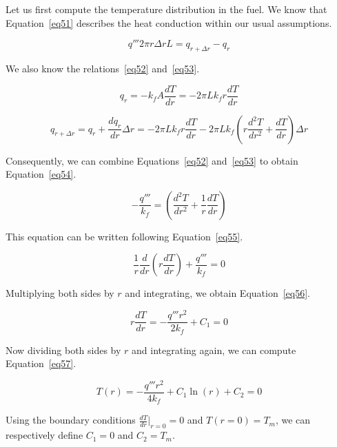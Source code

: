 Let us first compute the temperature distribution in the fuel. We know that Equation~\ref{eq51} describes the heat conduction within our usual assumptions.

\begin{equation}\label{eq51}
q'''2\pi r\Delta rL = q_{r+\Delta r} - q_r
\end{equation}

We also know the relations~\ref{eq52} and~\ref{eq53}.


\begin{equation}\label{eq52}
q_r = -k_fA\frac{dT}{dr} = -2\pi Lk_fr\frac{dT}{dr}
\end{equation}


\begin{equation}\label{eq53}
q_{r+\Delta r} = q_r + \frac{dq_r}{dr}\Delta r = -2\pi Lk_fr\frac{dT}{dr} - 2\pi Lk_f\left( r\frac{d^2T}{dr^2} + \frac{dT}{dr}\right)\Delta r
\end{equation}

Consequently, we can combine Equations~\ref{eq52} and~\ref{eq53} to obtain Equation~\ref{eq54}.


\begin{equation}\label{eq54}
- \frac{q'''}{k_f} = \left( \frac{d^2T}{dr^2} + \frac{1}{r}\frac{dT}{dr}\right)
\end{equation}

This equation can be written following Equation~\ref{eq55}.


\begin{equation}\label{eq55}
\frac{1}{r}\frac{d}{dr}\left( r\frac{dT}{dr}\right) + \frac{q'''}{k_f} = 0
\end{equation}

Multiplying both sides by $r$ and integrating, we obtain Equation~\ref{eq56}.


\begin{equation}\label{eq56}
r\frac{dT}{dr} = - \frac{q''' r^2}{2k_f} + C_1 = 0
\end{equation}

Now dividing both sides by $r$ and integrating again, we can compute Equation~\ref{eq57}.


\begin{equation}\label{eq57}
T(r) = - \frac{q''' r^2}{4k_f} + C_1\ln(r) + C_2 = 0
\end{equation}

Using the boundary conditions $\frac{dT}{dr}\bigg\rvert_{r=0} = 0$ and $T(r=0) = T_m$, we can respectively define $C_1 = 0$ and $C_2 = T_m$.

